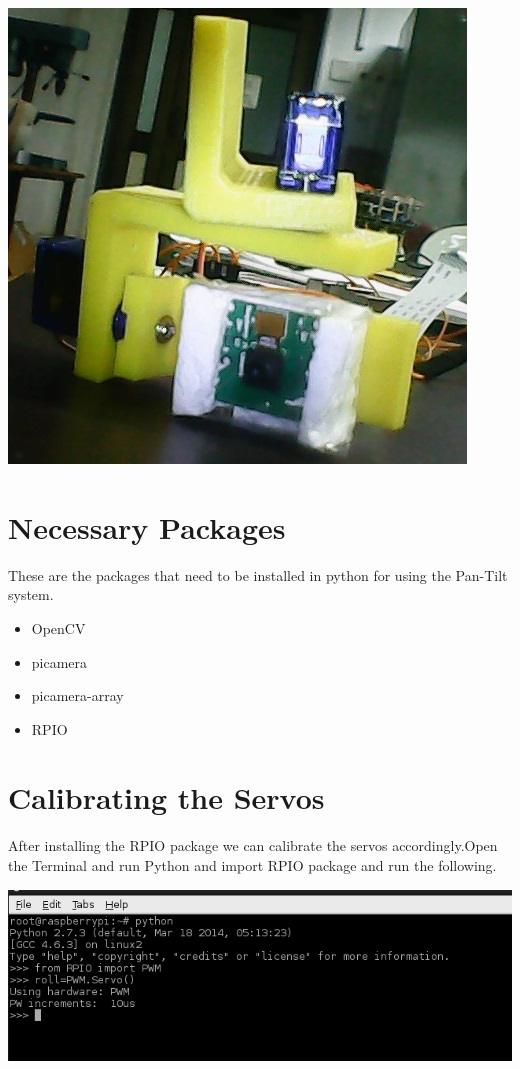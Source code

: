 \documentclass[11pt,a4paper]{article}
\begin{document}
		  \begin{center}
		   \includegraphics[scale=0.6]{frame.jpg}
		\end{center}
		
			
	\section{Necessary Packages}
    These are the packages that need to be installed in python for using the Pan-Tilt system.
	 \begin{itemize}
	 \item OpenCV
	 \item picamera
	 \item picamera-array
	 \item RPIO
	 \end{itemize}
		
	\section{Calibrating the Servos}
	 After installing the RPIO package we can calibrate the servos accordingly.Open the                       Terminal and run Python and import RPIO package and run the following.
	   \begin{center}
		   \includegraphics[scale=0.6]{cmd2.jpg}
		\end{center}
		
\end{document}
